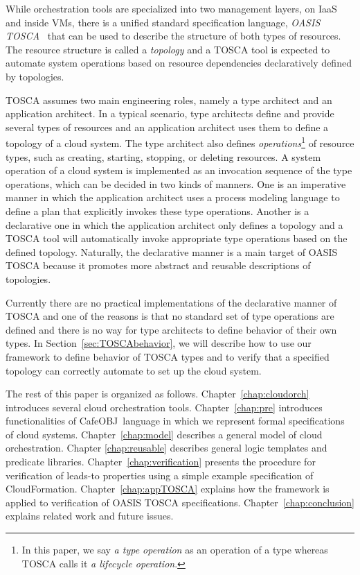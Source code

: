 \documentclass[12pt]{report}
\newcommand{\cafeobj}{{\sf CafeOBJ}~}
\begin{document}
While orchestration tools are specialized into two management layers,
on IaaS and inside VMs, there is a unified standard specification
language, {\it OASIS TOSCA}~\cite{TOSCA} that can be used to describe
the structure of both types of resources. The resource structure is
called a {\it topology} and a TOSCA tool is expected to automate
system operations based on resource dependencies declaratively defined
by topologies.

TOSCA assumes two main engineering roles, namely a type architect and
an application architect. In a typical scenario, type architects
define and provide several types of resources and an application
architect uses them to define a topology of a cloud system. The type
architect also defines {\it operations}\footnote{In this paper, we say
  {\it a type operation} as an operation of a type whereas TOSCA calls
  it {\it a lifecycle operation}.} of resource types, such as
creating, starting, stopping, or deleting resources. A system
operation of a cloud system is implemented as an invocation sequence
of the type operations, which can be decided in two kinds of
manners. One is an imperative manner in which the application
architect uses a process modeling language to define a plan that
explicitly invokes these type operations. Another is a declarative one
in which the application architect only defines a topology and a TOSCA
tool will automatically invoke appropriate type operations based on
the defined topology. Naturally, the declarative manner is a main
target of OASIS TOSCA because it promotes more abstract and reusable
descriptions of topologies.

Currently there are no practical implementations of the declarative
manner of TOSCA and one of the reasons is that no standard set of type
operations are defined and there is no way for type architects to
define behavior of their own types.  In
Section~\ref{sec:TOSCAbehavior}, we will describe how to use our
framework to define behavior of TOSCA types and to verify that a
specified topology can correctly automate to set up the cloud system.

\vspace{0.3cm}
The rest of this paper is organized as
follows. Chapter~\ref{chap:cloudorch} introduces several cloud
orchestration tools. Chapter~\ref{chap:pre} introduces functionalities
of \cafeobj language in which we represent formal specifications of
cloud systems. Chapter~\ref{chap:model} describes a general model of
cloud orchestration. Chapter \ref{chap:reusable} describes general
logic templates and predicate
libraries. Chapter~\ref{chap:verification} presents the procedure for
verification of leads-to properties using a simple example
specification of CloudFormation. Chapter~\ref{chap:appTOSCA} explains
how the framework is applied to verification of OASIS TOSCA
specifications.  Chapter~\ref{chap:conclusion} explains related work
and future issues.
\end{document}
